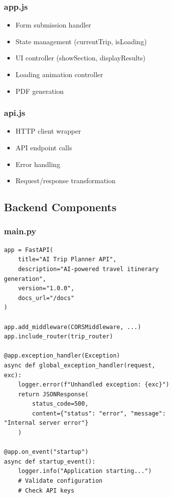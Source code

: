 \documentclass[12pt,a4paper]{report}
\begin{document}
\begin{figure}[H]
\begin{plantuml}
\begin{figure}[H]
\begin{plantuml}
\subsubsection{app.js}
\begin{itemize}
    \item Form submission handler
    \item State management (currentTrip, isLoading)
    \item UI controller (showSection, displayResults)
    \item Loading animation controller
    \item PDF generation
\end{itemize}

\subsubsection{api.js}
\begin{itemize}
    \item HTTP client wrapper
    \item API endpoint calls
    \item Error handling
    \item Request/response transformation
\end{itemize}

\subsection{Backend Components}

\subsubsection{main.py}

\begin{lstlisting}[style=pythonstyle, caption={FastAPI Application Initialization}]
app = FastAPI(
    title="AI Trip Planner API",
    description="AI-powered travel itinerary generation",
    version="1.0.0",
    docs_url="/docs"
)

app.add_middleware(CORSMiddleware, ...)
app.include_router(trip_router)

@app.exception_handler(Exception)
async def global_exception_handler(request, exc):
    logger.error(f"Unhandled exception: {exc}")
    return JSONResponse(
        status_code=500,
        content={"status": "error", "message": "Internal server error"}
    )

@app.on_event("startup")
async def startup_event():
    logger.info("Application starting...")
    # Validate configuration
    # Check API keys
\end{lstlisting}


\end{plantuml}
\end{figure}
\end{plantuml}
\end{figure}
\end{document}
